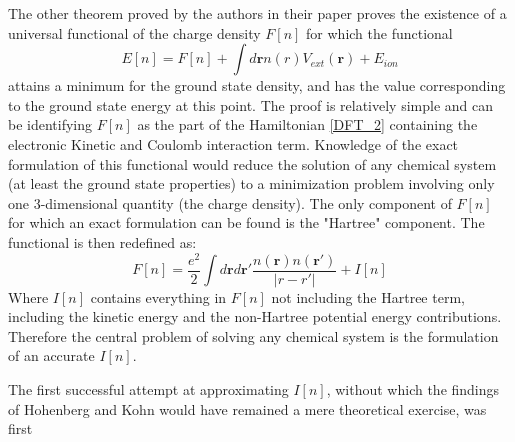 \documentclass[12pt,a4paper]{article}
\newcommand{\rmb}{\mathbf{r}}
\begin{document}
The other theorem proved by the authors in their paper proves the existence of   a universal functional of the charge density $F[n]$ for which the functional
\begin{equation}
E[n]=F[n] +\int d \rmb n(r) V_{ext}(\rmb) + E_{ion} 
\end{equation}
attains a minimum for the ground state density, and has the value corresponding to the ground state energy at this point. The proof is relatively simple and can be identifying $F[n]$ as the part of the Hamiltonian \ref{DFT_2} containing the electronic Kinetic and Coulomb interaction term. Knowledge of the exact formulation of this functional would reduce the solution of any chemical system (at least the ground state properties) to a minimization problem involving only one 3-dimensional quantity (the charge density). The only component of $F[n]$ for which an exact formulation can be found is the "Hartree" component. The functional is then redefined as:
\begin{equation}
 F[n]= \dfrac{e^2}{2}\int d\rmb d\rmb' \dfrac{n(\rmb) n(\rmb')}{|r-r'|} + I[n]
 \end{equation} 
Where $I[n]$ contains everything in $F[n]$ not including the Hartree term, including the kinetic energy and the non-Hartree potential energy contributions. Therefore the central problem of solving any chemical system is the formulation of an accurate $I[n]$.

The first successful attempt at approximating $I[n]$, without which the findings of Hohenberg and Kohn would have remained a mere theoretical exercise, was first 


	 
 


 
\end{document}
